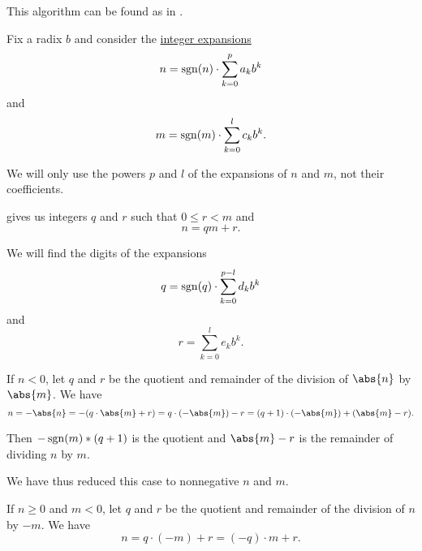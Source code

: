 \begin{comments}
  \item This algorithm can be found as  in \cite{notebook:code}.
\end{comments}

\begin{algorithm}\label{alg:long_division}
  Fix a radix \( b \) and consider the \hyperref[def:integer_radix_expansion]{integer expansions}
  \begin{equation*}
    n = \operatorname{sgn}(n) \cdot \sum_{k=0}^p a_k b^k
  \end{equation*}
  and
  \begin{equation*}
    m = \operatorname{sgn}(m) \cdot \sum_{k=0}^l c_k b^k.
  \end{equation*}

  We will only use the powers \( p \) and \( l \) of the expansions of \( n \) and \( m \), not their coefficients.

   gives us integers \( q \) and \( r \) such that \( 0 \leq r < m \) and
  \begin{equation*}
    n = qm + r.
  \end{equation*}

  We will find the digits of the expansions
  \begin{equation*}
    q = \operatorname{sgn}(q) \cdot \sum_{k=0}^{p - l} d_k b^k
  \end{equation*}
  and
  \begin{equation*}
    r = \sum_{k=0}^l e_k b^k.
  \end{equation*}

  \begin{thmenum}
     If \( n < 0 \), let \( q \) and \( r \) be the quotient and remainder of the division of \( \abs{n} \) by \( \abs{m} \). We have
    \begin{equation*}
      n = -\abs{n} = -(q \cdot \abs{m} + r) = q \cdot (-\abs{m}) - r = (q + 1) \cdot (-\abs{m}) + (\abs{m} - r).
    \end{equation*}

    Then \( -\operatorname{sgn}(m) * (q + 1) \) is the quotient and \( \abs{m} - r \) is the remainder of dividing \( n \) by \( m \).

    We have thus reduced this case to nonnegative \( n \) and \( m \).

     If \( n \geq 0 \) and \( m < 0 \), let \( q \) and \( r \) be the quotient and remainder of the division of \( n \) by \( -m \). We have
    \begin{equation*}
      n = q \cdot (-m) + r = (-q) \cdot m + r.
    \end{equation*}


\end{thmenum}
\end{algorithm}
